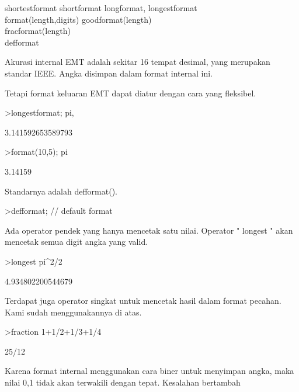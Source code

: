 \documentclass[a4paper,10pt]{article}
\begin{document}
\begin{eulernotebook}
\begin{eulercomment}
shortestformat shortformat longformat, longestformat\\
format(length,digits) goodformat(length)\\
fracformat(length)\\
defformat

Akurasi internal EMT adalah sekitar 16 tempat desimal, yang merupakan
standar IEEE. Angka disimpan dalam format internal ini.

Tetapi format keluaran EMT dapat diatur dengan cara yang fleksibel.
\end{eulercomment}
\begin{eulerprompt}
>longestformat; pi,
\end{eulerprompt}
\begin{euleroutput}
  3.141592653589793
\end{euleroutput}
\begin{eulerprompt}
>format(10,5); pi
\end{eulerprompt}
\begin{euleroutput}
    3.14159 
\end{euleroutput}
\begin{eulercomment}
Standarnya adalah defformat().
\end{eulercomment}
\begin{eulerprompt}
>defformat; // default format
\end{eulerprompt}
\begin{eulercomment}
Ada operator pendek yang hanya mencetak satu nilai. Operator " longest
" akan mencetak semua digit angka yang valid.
\end{eulercomment}
\begin{eulerprompt}
>longest pi^2/2
\end{eulerprompt}
\begin{euleroutput}
        4.934802200544679 
\end{euleroutput}
\begin{eulercomment}
Terdapat juga operator singkat untuk mencetak hasil dalam format
pecahan. Kami sudah menggunakannya di atas.
\end{eulercomment}
\begin{eulerprompt}
>fraction 1+1/2+1/3+1/4
\end{eulerprompt}
\begin{euleroutput}
  25/12
\end{euleroutput}
\begin{eulercomment}
Karena format internal menggunakan cara biner untuk menyimpan angka,
maka nilai 0,1 tidak akan terwakili dengan tepat. Kesalahan bertambah

\end{eulercomment}
\end{eulernotebook}
\end{document}
